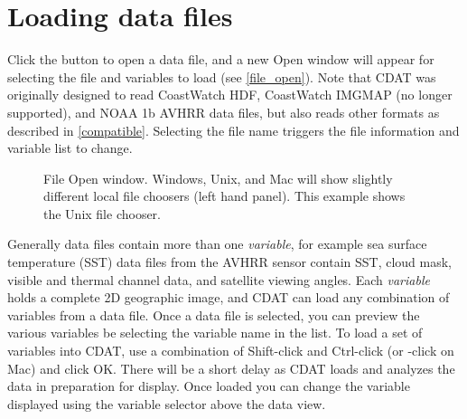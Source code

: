 \section{Loading data files}
\label{loading}

Click the  button to open a data file,
and a new {\gui Open} window will appear for selecting the file
and variables to load (see \autoref{file_open}).
Note
that CDAT was originally designed to read CoastWatch HDF,
CoastWatch IMGMAP (no longer supported), and NOAA 1b AVHRR data files, but also reads
other formats as described in \autoref{compatible}.
Selecting the file name
triggers the file information and variable list to change.

\begin{figure}
  \begin{center}
    \caption[File Open window]{
       File {\gui Open} window.  Windows, Unix, and Mac will show
       slightly different local file choosers (left hand panel).
       This example shows the Unix file chooser.
    }
    \label{file_open}
  \end{center}
\end{figure}

Generally data files contain more than one {\em variable}, for example
sea surface temperature (SST) data files from the AVHRR sensor contain
SST, cloud mask, visible and thermal channel data, and satellite
viewing angles.  Each {\em variable} holds a complete 2D geographic
image, and CDAT can load any combination of variables from a data
file.  Once a data file is selected, you can preview the various
variables be selecting the variable name in the list.  To load a set
of variables into CDAT, use a combination of Shift-click and
Ctrl-click (or -click on Mac) and click OK.  There
will be a short delay as CDAT loads and analyzes the data in
preparation for display.  Once loaded you can change the variable
displayed using the variable selector above the data view.

